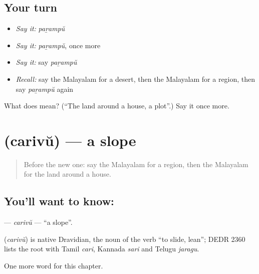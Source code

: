 \subsection*{Your turn}
\begin{itemize}
\raggedright
  \item \emph{Say it:} \emph{paṟampŭ}
  \item \emph{Say it:} \emph{paṟampŭ}, once more
  \item \emph{Say it:} say \emph{paṟampŭ}
  \item \emph{Recall:} say the Malayalam for a desert, then the Malayalam for a region, then say \emph{paṟampŭ} again
\end{itemize}

\begin{tcolorbox}[breakable,colback=teal!4,colframe=teal!35!black,title={Before you move on}]
What does  mean? (\textquotedblleft{}The land around a house, a plot\textquotedblright{}.) Say it once more.
\end{tcolorbox}
\section[\texorpdfstring{\ml{ചരിവ്} (carivŭ)}{ചരിവ് (carivŭ)}]{ (carivŭ) — a slope}

\label{lesson:ML-C280-carivu}



\begin{quote}
Before the new one: say the Malayalam for a region, then the Malayalam for the land around a house.
\end{quote}

\subsection*{You'll want to know: }
\textbf{} — \emph{carivŭ} — \textquotedblleft{}a slope\textquotedblright{}.

\begin{cousinweb}
\textbf{} (\emph{carivŭ}) is native Dravidian, the noun of the verb \textquotedblleft{}to slide, lean\textquotedblright{}; DEDR 2360 lists the root with Tamil \emph{cari}, Kannada \emph{sari} and Telugu \emph{jaragu}.
\end{cousinweb}

\begin{grammarlens}[title={What you've built}]
One more word for this chapter.
\end{grammarlens}

